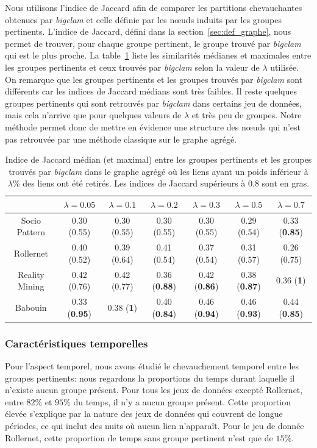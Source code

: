Nous utilisons l'indice de Jaccard afin de comparer les partitions chevauchantes obtenues par \emph{bigclam} et celle définie par les n\oe{}uds induits par les groupes pertinents.
L'indice de Jaccard, défini dans la section~\ref{sec:def_graphe}, nous permet de trouver, pour chaque groupe pertinent, le groupe trouvé par \emph{bigclam} qui est le plus proche.
La table~\ref{tab:Jaccard} liste les similarités médianes et maximales entre les groupes pertinents et ceux trouvés par \emph{bigclam} selon la valeur de $\lambda$ utilisée.
On remarque que les groupes pertinents et les groupes trouvés par \emph{bigclam} sont différents car les indices de Jaccard médians sont très faibles.
Il reste quelques groupes pertinents qui sont retrouvés par \emph{bigclam} dans certains jeu de données, mais cela n'arrive que pour quelques valeurs de $\lambda$ et très peu de groupes.
Notre méthode permet donc de mettre en évidence une structure des n\oe{}uds qui n'est pas retrouvée par une méthode classique sur le graphe agrégé.

\begin{table}
\centering
\hspace*{-15.75pt}
\begin{tabular}{|c|c|c|c|c|c|c|}
\hline  \rule[-1ex]{0pt}{3.5ex}  & $\lambda= 0.05$ &$\lambda= 0.1$ & $\lambda=0.2$ & $\lambda=0.3$ & $\lambda=0.5$ & $\lambda=0.7$ \\ 
\hline Socio Pattern & 0.30 (0.55)  & 0.30 (0.55)  & 0.30 (0.55)  & 0.30 (0.55)  & 0.29 (0.54) & 0.33 (\textbf{0.85})  \\ 
\hline Rollernet & 0.40 (0.52) & 0.39 (0.64) & 0.41 (0.54) & 0.37 (0.54) & 0.31 (0.57)  &  0.26 (0.75) \\ 
\hline Reality Mining & 0.42 (0.76)  & 0.42 (0.77) & 0.36 (\textbf{0.88}) & 0.42 (\textbf{0.86}) & 0.38 (\textbf{0.87})  & 0.36 (\textbf{1}) \\ 
\hline Babouin & 0.33 (\textbf{0.95}) & 0.38 (\textbf{1}) & 0.40 (\textbf{0.84}) & 0.46 (\textbf{0.94}) & 0.46 (\textbf{0.93}) & 0.44 (\textbf{0.85}) \\ 
\hline 
\end{tabular} 
\caption{Indice de Jaccard médian (et maximal) entre les groupes pertinents et les groupes trouvés par \emph{bigclam} dans le graphe agrégé où les liens ayant un poids inférieur à $\lambda\%$ des liens ont été retirés.
Les indices de Jaccard supérieurs à $0.8$ sont en gras.}
\label{tab:Jaccard}  
\end{table}

\subsubsection{Caractéristiques temporelles}
Pour l'aspect temporel, nous avons étudié le chevauchement temporel entre les groupes pertinents:
nous regardons la proportions du temps durant laquelle il n'existe aucun groupe présent.
Pour tous les jeux de données excepté Rollernet, entre $82\%$ et $95\%$ du temps, il n'y a aucun groupe présent.
Cette proportion élevée s'explique par la nature des jeux de données qui couvrent de longue périodes, ce qui inclut des nuits où aucun lien n'apparaît.
Pour le jeu de donnée Rollernet, cette proportion de temps sans groupe pertinent n'est que de $15\%$.

